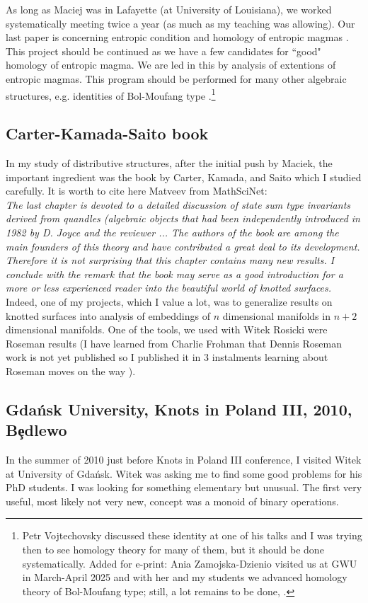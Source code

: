 \documentclass[12pt]{amsart}
\begin{document}
As long as Maciej was in Lafayette (at University of Louisiana), we worked systematically meeting twice a year (as much as my teaching was allowing). Our last paper is concerning entropic condition and homology of entropic magmas \cite{NiPr6}. This project should be continued as we have a few candidates for ``good" homology of entropic magma. We are led in this by analysis of extentions of entropic magmas. This program should be performed for many other algebraic structures, e.g. identities of Bol-Moufang type \cite{PhVo}.\footnote{Petr Vojtechovsky discussed these identity at one of his talks and 
I was trying then to see homology theory for many of them, but it should be done systematically. {\color{red}Added for e-print: Ania Zamojska-Dzienio visited us at GWU in March-April 2025 and with her and my students 
we advanced homology theory of Bol-Moufang type; still, a lot remains to be done, \cite{CCGOPZ}}.}

\subsection{Carter-Kamada-Saito book}
In my study of distributive structures, after the initial push by Maciek,
the important ingredient was the book by Carter, Kamada, and Saito \cite{CKS} which I studied carefully. It is worth to cite here Matveev from MathSciNet:\\
{\it The last chapter is devoted to a detailed discussion of state sum type invariants derived from quandles (algebraic objects that had been independently introduced in 1982 by D. Joyce \cite{Joy} and the reviewer \cite{Mat}... The authors of the book are among the main founders of this theory and have contributed a great deal to its development. Therefore it is not surprising that this chapter contains many new results. I conclude with the remark that the book may serve as a good introduction for a more or less experienced reader into the beautiful world of knotted surfaces.}
Indeed, one of my projects, which I value a lot, was to generalize results on knotted surfaces into analysis of embeddings of $n$ dimensional manifolds in $n+2$ dimensional manifolds. One of the tools, we used with Witek Rosicki were Roseman results (I have learned from Charlie Frohman that Dennis Roseman work is not yet published so I published it in 3 instalments learning about Roseman moves on the way \cite{Ros1,Ros2,Ros3,PrRo2}).

\subsection{Gda\'{n}sk University, Knots in Poland III, 2010, B{\c e}dlewo} In the summer of 2010 just before Knots in Poland III conference, I visited Witek at University of Gda\'nsk. 
Witek was asking me to find some good problems for his PhD students.
I was looking for something elementary but unusual. The first very useful, most likely not very new, concept was a monoid of binary operations.
\end{document}
